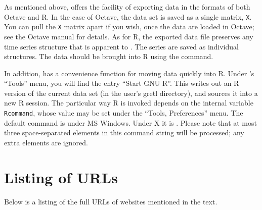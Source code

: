 As mentioned above,  offers the facility of exporting
data in the formats of both Octave and R.  In the case of Octave, the
 data set is saved as a single matrix, \verb+X+. You can
pull the \verb+X+ matrix apart if you wish, once the data are loaded
in Octave; see the Octave manual for details.  As for R, the exported
data file preserves any time series structure that is apparent to
.  The series are saved as individual structures. The data
should be brought into R using the  command.
  
In addition,  has a convenience function for moving data
quickly into R.  Under 's ``Tools'' menu, you will find the
entry ``Start GNU R''.  This writes out an R version of the current
 data set (in the user's gretl directory), and sources it
into a new R session.  The particular way R is invoked depends on the
internal  variable \verb+Rcommand+, whose value may be set
under the ``Tools, Preferences'' menu.  The default command is
 under MS Windows. Under X it is .
Please note that at most three space-separated elements in this
command string will be processed; any extra elements are ignored.

\chapter{Listing of URLs}
\label{app-urls}

Below is a listing of the full URLs of websites mentioned in the text.


